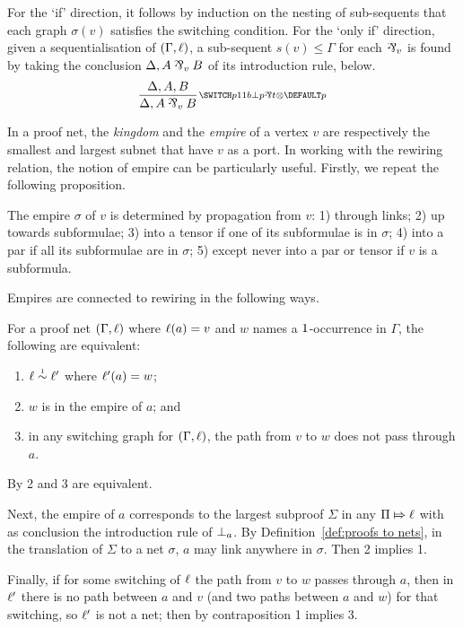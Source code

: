 \documentclass[conference]{IEEEtran}
\begin{document}
\begin{IEEEproof}
For the `if' direction, it follows by induction on the nesting of sub-sequents that each graph $\sigma(v)$ satisfies the switching condition.
%
For the `only if' direction, given a sequentialisation of $(\Gamma,\ell)$, a sub-sequent $s(v)\leq\Gamma$ for each $\named v\parr$ is found by taking the conclusion $\Delta, A\named v\parr B$ of its introduction rule, below.
\[
	\infer[\MLLlabel p]{\Delta,A\named v\parr B}{\Delta,A,B}
\]
\vskip-12pt
\end{IEEEproof}



In a proof net, the \emph{kingdom} and the \emph{empire} of a vertex $v$ are respectively the smallest and largest subnet that have $v$ as a port.
%
In working with the rewiring relation, the notion of empire can be particularly useful.
%
Firstly, we repeat the following proposition.


\begin{proposition}
\label{prop:empire propagation}
The empire $\sigma$ of $v$ is determined by propagation from $v$: 1) through links; 2) up towards subformulae; 3) into a tensor if one of its subformulae is in $\sigma$; 4) into a par if all its subformulae are in $\sigma$; 5) except never into a par or tensor if $v$ is a subformula.
\end{proposition}


Empires are connected to rewiring in the following ways.


\begin{lemma}
\label{lem:rewiring within empire}
For a proof net $(\Gamma,\ell)$ where $\ell(a)=v$ and $w$ names a $1$-occurrence in $\Gamma$, the following are equivalent:
%
\begin{enumerate}
	\item
$\links\perm*\links'$ where $\ell'(a)=w$;
	\item
$w$ is in the empire of $a$; and
	\item
in any switching graph for $(\Gamma,\ell)$, the path from $v$ to $w$ does not pass through $a$.
\end{enumerate}
\end{lemma}


\begin{IEEEproof}
By \cite[Proposition 2.a]{Bellin-vandeWiele-1995} 2 and 3 are equivalent.

Next, the empire of $a$ corresponds to the largest subproof $\Sigma$ in any $\Pi\Mapsto\ell$ with as conclusion the introduction rule of $\bot_{a}$.
%
By Definition~\ref{def:proofs to nets}, in the translation of $\Sigma$ to a net $\sigma$, $a$ may link anywhere in $\sigma$.
%
Then 2 implies 1. 

Finally, if for some switching of $\ell$ the path from $v$ to $w$ passes through $a$, then in $\ell'$ there is no path between $a$ and $v$ (and two paths between $a$ and $w$) for that switching, so $\ell'$ is not a net; then by contraposition 1 implies 3.
%
\end{IEEEproof}
\end{document}

